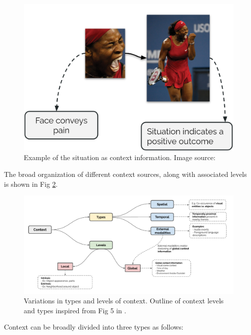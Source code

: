 \begin{figure}[h!]
    \centering 
    \includegraphics[width=0.6\linewidth]{figures/context_situation.png}
    \caption{Example of the situation as context information. Image source: \cite{barrettcontext} }
    \label{context situation}
\end{figure}


The broad organization of different context sources, along with associated levels is shown in Fig \ref{Context_type}.
\begin{figure}[t]
  \centering
  \includegraphics[width=\linewidth]{figures/Context_type.pdf}
  \caption{Variations in types and levels of context. Outline of context levels and types inspired from Fig 5 in \cite{contextvision}.}
  \label{Context_type}
\end{figure}
Context can be broadly divided into three types as follows:

